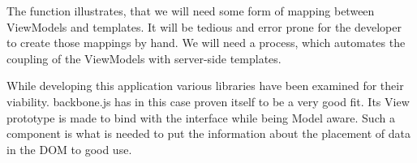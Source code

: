 \documentclass[thesis.tex]{subfiles}
\begin{document}
The function  illustrates, that we will need some form
of mapping between ViewModels and templates.
It will be tedious and error prone for the developer to create those mappings
by hand. We will need a process, which automates the coupling of the ViewModels
with server-side templates.

While developing this application various libraries have been examined for their
viability. backbone.js has in this case proven itself to be a very good fit.
Its View prototype is made to bind with the interface while being Model aware.
Such a component is what is needed to put the information about
the placement of data in the DOM to good use.
\end{document}
